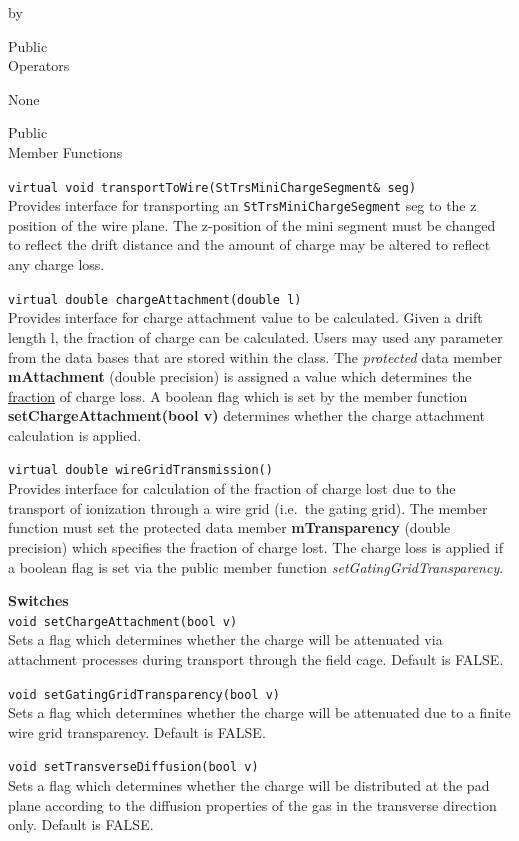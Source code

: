 \documentclass[twoside]{article}
\newcommand{\comp}[1]{\texttt{#1}}%
\newcommand{\entrylabel}[1]{\mbox{\textbf{{#1}}}\hfil}%
\newenvironment{entry}
{\begin{list}{}%
    {\renewcommand{\makelabel}{\entrylabel}%
     \setlength{\labelwidth}{90pt}%
     \setlength{\leftmargin}{\labelwidth}
     \advance\leftmargin by \labelsep%
      }%
    }%
  {\end{list}}
\newcommand{\Entrylabel}[1]%
{\raisebox{0pt}[1ex][0pt]{\makebox[\labelwidth][l]%
    {\parbox[t]{\labelwidth}{\hspace{0pt}\textbf{{#1}}}}}}
\newenvironment{Entry}%
{\renewcommand{\entrylabel}{\Entrylabel}\begin{entry}}%
  {\end{entry}}
\begin{document}
\begin{Entry}
\item[Public \\ Operators]
  
   None

\item[Public \\ Member Functions]

  \verb+virtual void transportToWire(StTrsMiniChargeSegment& seg)+\\
  Provides interface for transporting an \comp{StTrsMiniChargeSegment} seg
  to the z position of the wire plane.  The z-position of the mini
  segment must be changed to reflect the drift distance and the
  amount of charge may be altered to reflect any charge loss.

  \verb+virtual double chargeAttachment(double l)+\\
  Provides interface for charge attachment value to be calculated.
  Given a drift length l, the fraction of charge can be calculated.
  Users may used any parameter from the data bases that are stored
  within the class.  The {\em protected} data member {\bf mAttachment}
  (double precision) is assigned a value which determines 
  the \underline{fraction} of
  charge loss.  A boolean flag which is set by the member function
  {\bf setChargeAttachment(bool v)} determines whether the charge
  attachment calculation is applied.

  \verb+virtual double wireGridTransmission()+\\
  Provides interface for calculation of the fraction of charge lost
  due to the transport of ionization through a wire grid (i.e.~the
  gating grid).  The member function must set the protected data member
  {\bf mTransparency} (double precision) which specifies the fraction
  of charge lost.  The charge loss is applied if a boolean flag is
  set via the public member function {\em setGatingGridTransparency}.

  {\bf  Switches \\}
  \verb+void setChargeAttachment(bool v)+\\
  Sets a flag which determines whether the charge will be attenuated via
  attachment processes during transport through the field cage.
  Default is FALSE.

  \verb+void setGatingGridTransparency(bool v)+\\
  Sets a flag which determines whether the charge will be attenuated due
  to a finite wire grid transparency.  Default is FALSE.

  \verb+void setTransverseDiffusion(bool v)+\\
  Sets a flag which determines whether the charge will be distributed
  at the pad plane according to the diffusion properties of the gas
  in the transverse direction only.  Default is FALSE.


\end{Entry}
\end{document}
